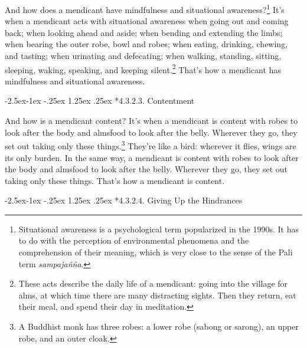 \documentclass[12pt,openany]{book}%
\makeatletter
\renewcommand\paragraph{\@startsection{paragraph}{4}{\z@}%
            {-2.5ex\@plus -1ex \@minus -.25ex}%
            {1.25ex \@plus .25ex}%
            {\noindent\normalfont\itshape\small}}
\makeatother
\begin{document}
And how does a mendicant have mindfulness and situational awareness?\footnote{Situational awareness is a psychological term popularized in the 1990s. It has to do with the perception of environmental phenomena and the comprehension of their meaning, which is very close to the sense of the Pali term \textit{\textsanskrit{sampajañña}}. } It’s when a mendicant acts with situational awareness when going out and coming back; when looking ahead and aside; when bending and extending the limbs; when bearing the outer robe, bowl and robes; when eating, drinking, chewing, and tasting; when urinating and defecating; when walking, standing, sitting, sleeping, waking, speaking, and keeping silent.\footnote{These acts describe the daily life of  a mendicant: going into the village for alms, at which time there are many distracting sights. Then they return, eat their meal, and spend their day in meditation. } That’s how a mendicant has mindfulness and situational awareness. 

\paragraph*{4.3.2.3. Contentment }

And how is a mendicant content? It’s when a mendicant is content with robes to look after the body and almsfood to look after the belly. Wherever they go, they set out taking only these things.\footnote{A Buddhist monk has three robes: a lower robe (sabong or sarong), an upper robe, and an outer cloak. } They’re like a bird: wherever it flies, wings are its only burden. In the same way, a mendicant is content with robes to look after the body and almsfood to look after the belly. Wherever they go, they set out taking only these things. That’s how a mendicant is content. 

\paragraph*{4.3.2.4. Giving Up the Hindrances }
\end{document}
